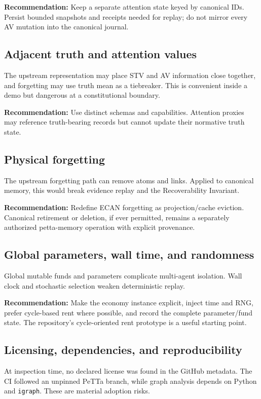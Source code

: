 \documentclass[11pt]{article}
\newcommand{\code}[1]{\texttt{#1}}
\newcommand{\rec}{\textbf{Recommendation:} }
\begin{document}
\rec Keep a separate attention state keyed by canonical IDs.  Persist bounded
snapshots and receipts needed for replay; do not mirror every AV mutation into
the canonical journal.

\subsection{Adjacent truth and attention values}

The upstream representation may place STV and AV information close together,
and forgetting may use truth mean as a tiebreaker.  This is convenient inside a
demo but dangerous at a constitutional boundary.

\rec Use distinct schemas and capabilities.  Attention proxies may reference
truth-bearing records but cannot update their normative truth state.

\subsection{Physical forgetting}

The upstream forgetting path can remove atoms and links.  Applied to canonical
memory, this would break evidence replay and the Recoverability Invariant.

\rec Redefine ECAN forgetting as projection/cache eviction.  Canonical
retirement or deletion, if ever permitted, remains a separately authorized
petta-memory operation with explicit provenance.

\subsection{Global parameters, wall time, and randomness}

Global mutable funds and parameters complicate multi-agent isolation.  Wall
clock and stochastic selection weaken deterministic replay.

\rec Make the economy instance explicit, inject time and RNG, prefer cycle-based
rent where possible, and record the complete parameter/fund state.  The
repository's cycle-oriented rent prototype is a useful starting point.

\subsection{Licensing, dependencies, and reproducibility}

At inspection time, no declared license was found in the GitHub metadata.  The
CI followed an unpinned PeTTa branch, while graph analysis depends on Python and
\code{igraph}.  These are material adoption risks.
\end{document}
